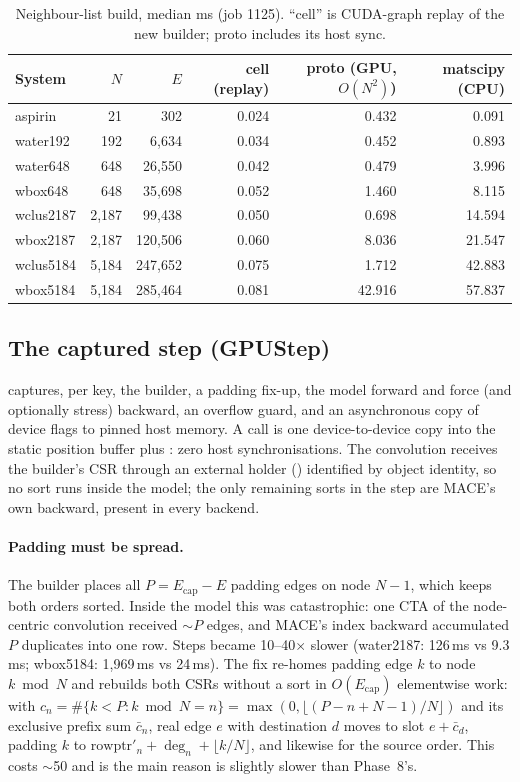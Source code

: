 \begin{table}[h]
\centering
\caption{Neighbour-list build, median ms (job 1125). ``cell'' is CUDA-graph replay of the new builder; proto includes its host sync.}
\label{tab:nltime}
\small
\begin{tabular}{lrrrrr}
\toprule
System & $N$ & $E$ & cell (replay) & proto (GPU, $O(N^2)$) & matscipy (CPU) \\
\midrule
aspirin & 21 & 302 & 0.024 & 0.432 & 0.091 \\
water192 & 192 & 6{,}634 & 0.034 & 0.452 & 0.893 \\
water648 & 648 & 26{,}550 & 0.042 & 0.479 & 3.996 \\
wbox648 & 648 & 35{,}698 & 0.052 & 1.460 & 8.115 \\
wclus2187 & 2{,}187 & 99{,}438 & 0.050 & 0.698 & 14.594 \\
wbox2187 & 2{,}187 & 120{,}506 & 0.060 & 8.036 & 21.547 \\
wclus5184 & 5{,}184 & 247{,}652 & 0.075 & 1.712 & 42.883 \\
wbox5184 & 5{,}184 & 285{,}464 & 0.081 & 42.916 & 57.837 \\
\bottomrule
\end{tabular}
\end{table}

\subsection{The captured step (GPUStep)}
 captures, per key, the builder, a padding fix-up, the model forward and force (and optionally stress) backward, an overflow guard, and an asynchronous copy of device flags to pinned host memory. A call is one device-to-device copy into the static position buffer plus : zero host synchronisations. The convolution receives the builder's CSR through an external holder () identified by object identity, so no sort runs inside the model; the only remaining sorts in the step are MACE's own  backward, present in every backend.

\paragraph{Padding must be spread.} The builder places all $P=E_{\text{cap}}-E$ padding edges on node $N-1$, which keeps both orders sorted. Inside the model this was catastrophic: one CTA of the node-centric convolution received $\sim$$P$ edges, and MACE's index backward accumulated $P$ duplicates into one row. Steps became 10--40$\times$ slower (water2187: 126\,ms vs 9.3\,ms; wbox5184: 1{,}969\,ms vs 24\,ms). The fix re-homes padding edge $k$ to node $k\bmod N$ and rebuilds both CSRs without a sort in $O(E_{\text{cap}})$ elementwise work: with $c_n=\#\{k<P:k\bmod N=n\}=\max(0,\lfloor(P-n+N-1)/N\rfloor)$ and its exclusive prefix sum $\bar c_n$, real edge $e$ with destination $d$ moves to slot $e+\bar c_d$, padding $k$ to $\text{rowptr}'_n+\deg_n+\lfloor k/N\rfloor$, and likewise for the source order. This costs $\sim$50\us{} and is the main reason \Bone{} is slightly slower than Phase~8's.

